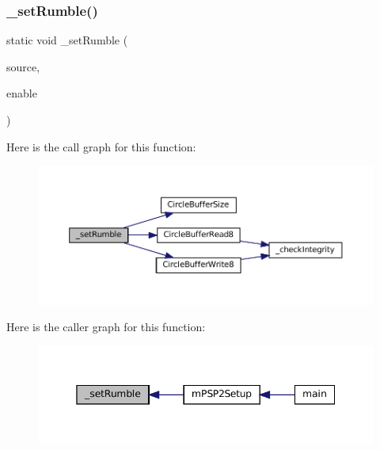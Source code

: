 \subsubsection{\texorpdfstring{\+\_\+set\+Rumble()}{\_setRumble()}}
{\footnotesize\ttfamily static void \+\_\+set\+Rumble (\begin{DoxyParamCaption}\item[{struct m\+Rumble $\ast$}]{source,  }\item[{\mbox{\hyperlink{ioapi_8h_a787fa3cf048117ba7123753c1e74fcd6}{int}}}]{enable }\end{DoxyParamCaption})\hspace{0.3cm}{\ttfamily [static]}}

Here is the call graph for this function\+:
\nopagebreak
\begin{figure}[H]
\begin{center}
\leavevmode
\includegraphics[width=350pt]{psp2-context_8c_a95b8d13de5bec09567398f90454a054c_cgraph}
\end{center}
\end{figure}
Here is the caller graph for this function\+:
\nopagebreak
\begin{figure}[H]
\begin{center}
\leavevmode
\includegraphics[width=345pt]{psp2-context_8c_a95b8d13de5bec09567398f90454a054c_icgraph}
\end{center}
\end{figure}
\mbox{\label{psp2-context_8c_a4623f2123706c3c47aeed159b0f08e58}} 
